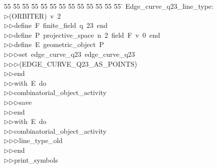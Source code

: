 %
%
\begin{tabbing}
55 \= 55 \= 55 \= 55 \= 55 \= 55 \= 55 \= 55 \= 55 \= 55 \= 55 \= 55 \= 55 \= \kill
Edge\_curve\_q23\_line\_type:\\[0pt]
$\triangleright$\>(ORBITER)\ v\ 2\ \\[0pt]
$\triangleright$\>$\triangleright$\>define\ F\ finite\_field\ q\ 23\ end\ \\[0pt]
$\triangleright$\>$\triangleright$\>define\ P\ projective\_space\ n\ 2\ field\ F\ v\ 0\ end\ \\[0pt]
$\triangleright$\>$\triangleright$\>define\ E\ geometric\_object\ P\ \\[0pt]
$\triangleright$\>$\triangleright$\>$\triangleright$\>set\ edge\_curve\_q23\ edge\_curve\_q23\ \\[0pt]
$\triangleright$\>$\triangleright$\>$\triangleright$\>(EDGE\_CURVE\_Q23\_AS\_POINTS)\ \\[0pt]
$\triangleright$\>$\triangleright$\>end\ \\[0pt]
$\triangleright$\>$\triangleright$\>with\ E\ do\ \\[0pt]
$\triangleright$\>$\triangleright$\>combinatorial\_object\_activity\ \\[0pt]
$\triangleright$\>$\triangleright$\>$\triangleright$\>save\ \\[0pt]
$\triangleright$\>$\triangleright$\>end\ \\[0pt]
$\triangleright$\>$\triangleright$\>with\ E\ do\ \\[0pt]
$\triangleright$\>$\triangleright$\>combinatorial\_object\_activity\ \\[0pt]
$\triangleright$\>$\triangleright$\>$\triangleright$\>line\_type\_old\ \\[0pt]
$\triangleright$\>$\triangleright$\>end\ \\[0pt]
$\triangleright$\>$\triangleright$\>print\_symbols\\[0pt]
\end{tabbing}
